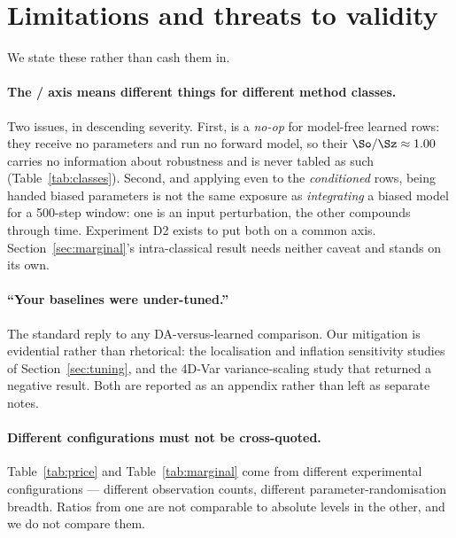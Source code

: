 \section{Limitations and threats to validity}
\label{sec:limitations}

We state these rather than cash them in.

\paragraph{The \Sz{}/\So{} axis means different things for different method
classes.}
Two issues, in descending severity. First, \So{} is a \emph{no-op} for
model-free learned rows: they receive no parameters and run no forward model, so
their $\So/\Sz \approx 1.00$ carries no information about robustness and is never
tabled as such (Table~\ref{tab:classes}). Second, and applying even to the
\emph{conditioned} rows, being handed biased parameters is not the same exposure
as \emph{integrating} a biased model for a 500-step window: one is an input
perturbation, the other compounds through time. Experiment D2 exists to put both
on a common axis. Section~\ref{sec:marginal}'s intra-classical result needs
neither caveat and stands on its own.

\paragraph{``Your baselines were under-tuned.''}
The standard reply to any DA-versus-learned comparison. Our mitigation is
evidential rather than rhetorical: the localisation and inflation sensitivity
studies of Section~\ref{sec:tuning}, and the 4D-Var variance-scaling study that
returned a negative result. Both are reported as an appendix rather than left as
separate notes.

\paragraph{Different configurations must not be cross-quoted.}
Table~\ref{tab:price} and Table~\ref{tab:marginal} come from different
experimental configurations --- different observation counts, different
parameter-randomisation breadth. Ratios from one are not comparable to
absolute levels in the other, and we do not compare them.

